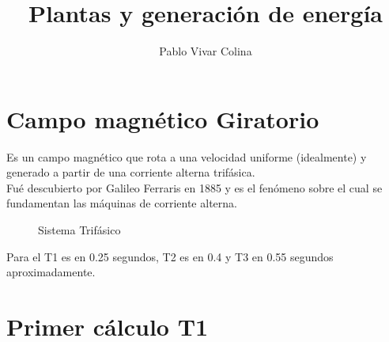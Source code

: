 \documentclass[]{article}
\title{Plantas y generación de energía}
\author{Pablo Vivar Colina}
\begin{document}
	

\maketitle





\section{Campo magnético Giratorio}

Es un campo magnético que rota a una velocidad uniforme (idealmente) y generado a partir de una corriente alterna trifásica.\\

Fué descubierto por Galileo Ferraris en 1885 y es el fenómeno sobre el cual se fundamentan las máquinas de corriente alterna.\\

\begin{figure}[h!]
	\centering
	
	\caption{Sistema Trifásico}
	\label{sitemaTrifasico}
\end{figure}


Para el T1 es en 0.25 segundos, T2 es en 0.4 y T3 en 0.55$  $ segundos aproximadamente.\\

\section{Primer cálculo T1}
\end{document}
